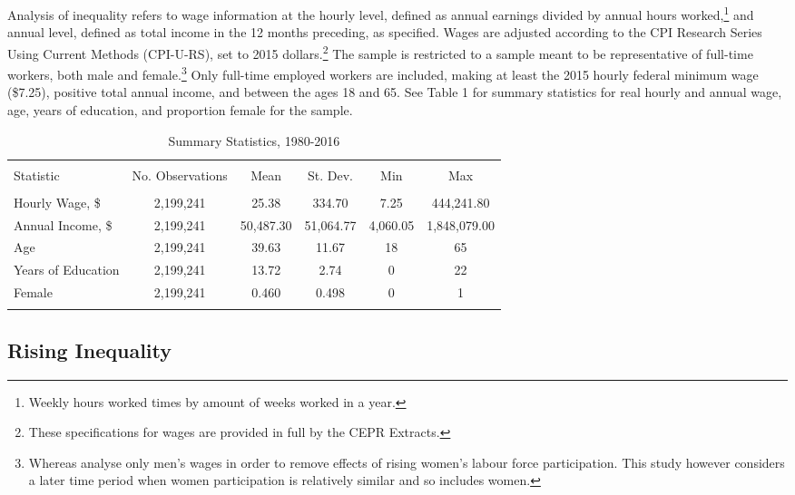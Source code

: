 \documentclass[notitlepage,12pt]{article}
\begin{document}
Analysis of inequality refers to wage information at the hourly level, defined as annual earnings divided by annual hours worked,\footnote{Weekly hours worked times by amount of weeks worked in a year.} and annual level, defined as total income in the 12 months preceding, as specified.  Wages are adjusted according to the CPI Research Series Using Current Methods (CPI-U-RS), set to 2015 dollars.\footnote{These specifications for wages are provided in full by the CEPR Extracts.}  The sample is restricted to a sample meant to be representative of full-time workers, both male and female.\footnote{Whereas \cite{juhn1993wage} analyse only men's wages in order to remove effects of rising women's labour force participation.  This study however considers a later time period when women participation is relatively similar and so includes women.}  Only full-time employed workers are included, making at least the 2015 hourly federal minimum wage (\$7.25), positive total annual income, and between the ages 18 and 65.  See Table 1 for summary statistics for real hourly and annual wage, age, years of education, and proportion female for the sample.

\begin{table}[!htbp] \centering 
  \caption{Summary Statistics, 1980-2016} 
  \label{} 
\begin{tabular}{@{\extracolsep{5pt}}lccccc} 
\\[-1.8ex]\hline 
\hline \\[-1.8ex] 
Statistic & \multicolumn{1}{c}{No. Observations} & \multicolumn{1}{c}{Mean} & \multicolumn{1}{c}{St. Dev.} & \multicolumn{1}{c}{Min} & \multicolumn{1}{c}{Max} \\ 
\hline \\[-1.8ex] 
Hourly Wage, \$ & 2,199,241 & 25.38 & 334.70 & 7.25 & 444,241.80 \\ 
Annual Income, \$ & 2,199,241 & 50,487.30 & 51,064.77 & 4,060.05 & 1,848,079.00 \\ 
Age & 2,199,241 & 39.63 & 11.67 & 18 & 65 \\ 
Years of Education & 2,199,241 & 13.72 & 2.74 & 0 & 22 \\ 
Female & 2,199,241 & 0.460 & 0.498 & 0 & 1 \\ 
\hline \\[-1.8ex] 
\end{tabular} 
\end{table}

\subsection{Rising Inequality}
\end{document}
